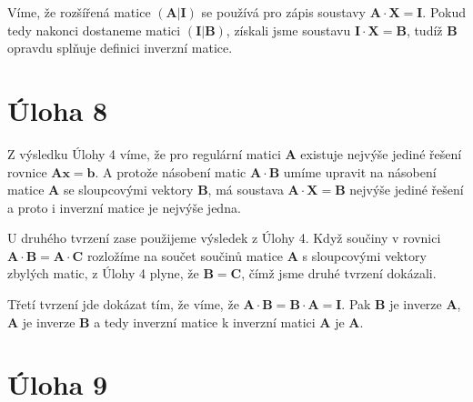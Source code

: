 \documentclass{fkssolpub}
\begin{document}
Víme, že rozšířená matice $(\mathbf{A}|\mathbf{I})$ se používá pro zápis soustavy $\mathbf{A} \cdot \mathbf{X} = \mathbf{I}$. Pokud tedy nakonci dostaneme matici $(\mathbf{I}|\mathbf{B})$, získali jsme soustavu $\mathbf{I} \cdot \mathbf{X} = \mathbf{B}$, tudíž $\mathbf{B}$ opravdu splňuje definici inverzní matice.

\section{Úloha 8}

Z výsledku Úlohy 4 víme, že pro regulární matici $\mathbf{A}$ existuje nejvýše jediné řešení rovnice $\mathbf{A} \mathbf{x} = \mathbf{b}$. A protože násobení matic $\mathbf{A} \cdot \mathbf{B}$ umíme upravit na násobení matice $\mathbf{A}$ se sloupcovými vektory $\mathbf{B}$, má soustava $\mathbf{A} \cdot \mathbf{X} = \mathbf{B}$ nejvýše jediné řešení a proto i inverzní matice je nejvýše jedna.

U druhého tvrzení zase použijeme výsledek z Úlohy 4. Když součiny v rovnici $\mathbf{A} \cdot \mathbf{B} = \mathbf{A} \cdot \mathbf{C}$ rozložíme na součet součinů matice $\mathbf{A}$ s sloupcovými vektory zbylých matic, z Úlohy 4 plyne, že $\mathbf{B} = \mathbf{C}$, čímž jsme druhé tvrzení dokázali.

Třetí tvrzení jde dokázat tím, že víme, že $\mathbf{A} \cdot \mathbf{B} = \mathbf{B} \cdot \mathbf{A} = \mathbf{I}$. Pak $\mathbf{B}$ je inverze $\mathbf{A}$, $\mathbf{A}$ je inverze $\mathbf{B}$ a tedy inverzní matice k inverzní matici $\mathbf{A}$ je $\mathbf{A}$.

\section{Úloha 9}
\end{document}
